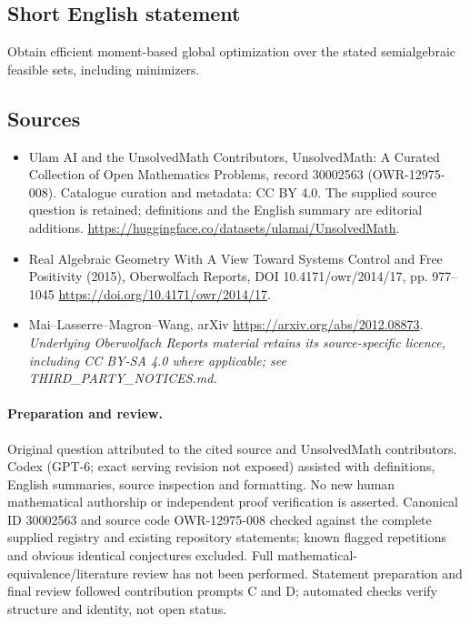 \documentclass[11pt]{article}
\begin{document}
\subsection{Short English statement}
Obtain efficient moment-based global optimization over the stated semialgebraic feasible sets, including minimizers.
\subsection{Sources}
\begin{itemize}
\item[\hypertarget{source:30002563:1}{S1}] Ulam AI and the UnsolvedMath Contributors, UnsolvedMath: A Curated Collection of Open Mathematics Problems, record 30002563 (OWR-12975-008). Catalogue curation and metadata: CC BY 4.0. The supplied source question is retained; definitions and the English summary are editorial additions.
\url{https://huggingface.co/datasets/ulamai/UnsolvedMath}.
\item[\hypertarget{source:30002563:2}{S2}] Real Algebraic Geometry With A View Toward Systems Control and Free Positivity (2015), Oberwolfach Reports, DOI 10.4171/owr/2014/17, pp. 977--1045
\url{https://doi.org/10.4171/owr/2014/17}.
\item[\hypertarget{source:30002563:3}{S3}] Mai--Lasserre--Magron--Wang, arXiv
\url{https://arxiv.org/abs/2012.08873}.
\textit{Underlying Oberwolfach Reports material retains its source-specific licence, including CC BY-SA 4.0 where applicable; see THIRD\_PARTY\_NOTICES.md.}
\end{itemize}
\paragraph{Preparation and review.}
Original question attributed to the cited source and UnsolvedMath contributors. Codex (GPT-6; exact serving revision not exposed) assisted with definitions, English summaries, source inspection and formatting. No new human mathematical authorship or independent proof verification is asserted. Canonical ID 30002563 and source code OWR-12975-008 checked against the complete supplied registry and existing repository statements; known flagged repetitions and obvious identical conjectures excluded. Full mathematical-equivalence/literature review has not been performed. Statement preparation and final review followed contribution prompts C and D; automated checks verify structure and identity, not open status.
\label{end:30002563}
\end{document}
